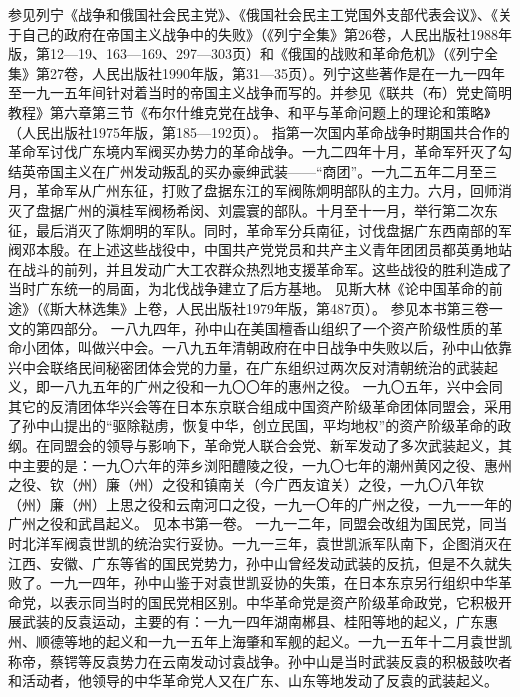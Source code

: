\begin{maonote}
参见列宁《战争和俄国社会民主党》、《俄国社会民主工党国外支部代表会议》、《关于自己的政府在帝国主义战争中的失败》（《列宁全集》第26卷，人民出版社1988年版，第12—19、163—169、297—303页）和《俄国的战败和革命危机》（《列宁全集》第27卷，人民出版社1990年版，第31—35页）。列宁这些著作是在一九一四年至一九一五年间针对着当时的帝国主义战争而写的。并参见《联共（布）党史简明教程》第六章第三节《布尔什维克党在战争、和平与革命问题上的理论和策略》（人民出版社1975年版，第185—192页）。
指第一次国内革命战争时期国共合作的革命军讨伐广东境内军阀买办势力的革命战争。一九二四年十月，革命军歼灭了勾结英帝国主义在广州发动叛乱的买办豪绅武装——“商团”。一九二五年二月至三月，革命军从广州东征，打败了盘据东江的军阀陈炯明部队的主力。六月，回师消灭了盘据广州的滇桂军阀杨希闵、刘震寰的部队。十月至十一月，举行第二次东征，最后消灭了陈炯明的军队。同时，革命军分兵南征，讨伐盘据广东西南部的军阀邓本殷。在上述这些战役中，中国共产党党员和共产主义青年团团员都英勇地站在战斗的前列，并且发动广大工农群众热烈地支援革命军。这些战役的胜利造成了当时广东统一的局面，为北伐战争建立了后方基地。
见斯大林《论中国革命的前途》（《斯大林选集》上卷，人民出版社1979年版，第487页）。
参见本书第三卷一文的第四部分。
一八九四年，孙中山在美国檀香山组织了一个资产阶级性质的革命小团体，叫做兴中会。一八九五年清朝政府在中日战争中失败以后，孙中山依靠兴中会联络民间秘密团体会党的力量，在广东组织过两次反对清朝统治的武装起义，即一八九五年的广州之役和一九〇〇年的惠州之役。
一九〇五年，兴中会同其它的反清团体华兴会等在日本东京联合组成中国资产阶级革命团体同盟会，采用了孙中山提出的“驱除鞑虏，恢复中华，创立民国，平均地权”的资产阶级革命的政纲。在同盟会的领导与影响下，革命党人联合会党、新军发动了多次武装起义，其中主要的是：一九〇六年的萍乡浏阳醴陵之役，一九〇七年的潮州黄冈之役、惠州之役、钦（州）廉（州）之役和镇南关（今广西友谊关）之役，一九〇八年钦（州）廉（州）上思之役和云南河口之役，一九一〇年的广州之役，一九一一年的广州之役和武昌起义。
见本书第一卷。
一九一二年，同盟会改组为国民党，同当时北洋军阀袁世凯的统治实行妥协。一九一三年，袁世凯派军队南下，企图消灭在江西、安徽、广东等省的国民党势力，孙中山曾经发动武装的反抗，但是不久就失败了。一九一四年，孙中山鉴于对袁世凯妥协的失策，在日本东京另行组织中华革命党，以表示同当时的国民党相区别。中华革命党是资产阶级革命政党，它积极开展武装的反袁运动，主要的有：一九一四年湖南郴县、桂阳等地的起义，广东惠州、顺德等地的起义和一九一五年上海肇和军舰的起义。一九一五年十二月袁世凯称帝，蔡锷等反袁势力在云南发动讨袁战争。孙中山是当时武装反袁的积极鼓吹者和活动者，他领导的中华革命党人又在广东、山东等地发动了反袁的武装起义。

\end{maonote}
